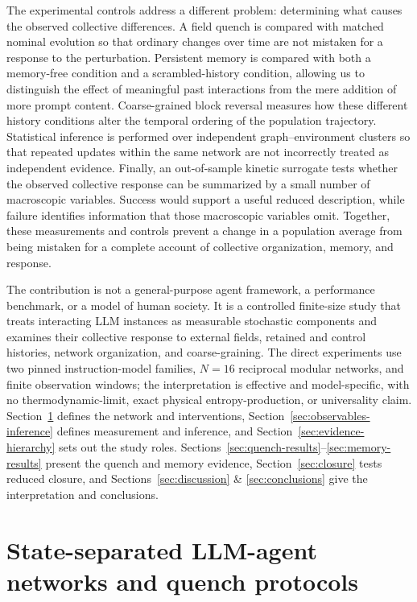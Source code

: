 \documentclass[12pt]{article}
\begin{document}
The experimental controls address a different problem: determining what
causes the observed collective differences. A field quench is compared with
matched nominal evolution so that ordinary changes over time are not mistaken
for a response to the perturbation. Persistent memory is compared with both a
memory-free condition and a scrambled-history condition, allowing us to
distinguish the effect of meaningful past interactions from the mere addition
of more prompt content. Coarse-grained block reversal measures how these
different history conditions alter the temporal ordering of the population
trajectory. Statistical inference is performed over independent
graph--environment clusters so that repeated updates within the same network
are not incorrectly treated as independent evidence. Finally, an
out-of-sample kinetic surrogate tests whether the observed collective response
can be summarized by a small number of macroscopic variables. Success would
support a useful reduced description, while failure identifies information
that those macroscopic variables omit. Together, these measurements and
controls prevent a change in a population average from being mistaken for a
complete account of collective organization, memory, and response.


The contribution is not a general-purpose agent framework, a performance
benchmark, or a model of human society.  It is a controlled finite-size study
that treats interacting LLM instances as measurable stochastic components and
examines their collective response to external fields, retained and control
histories, network organization, and coarse-graining.  The direct experiments
use two pinned instruction-model families, $N=16$ reciprocal modular networks,
and finite observation windows; the interpretation is effective and
model-specific, with no thermodynamic-limit, exact physical
entropy-production, or universality claim.  Section~\ref{sec:system-protocol}
defines the network and interventions, Section~\ref{sec:observables-inference}
defines measurement and inference, and Section~\ref{sec:evidence-hierarchy}
sets out the study roles.  Sections~\ref{sec:quench-results}--\ref{sec:memory-results}
present the quench and memory evidence, Section~\ref{sec:closure} tests reduced
closure, and Sections~\ref{sec:discussion} \& \ref{sec:conclusions} give the
interpretation and conclusions.


\section{State-separated LLM-agent networks and quench protocols}
\label{sec:system-protocol}
\end{document}
